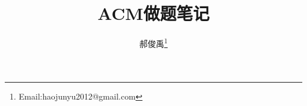 \documentclass[10pt,a4paper]{article}
\begin{document}
\begin{CJK*}{UTF8}{gkai}
\title{ACM做题笔记}							   					%
\author{郝俊禹\thanks{Email:haojunyu2012@gmail.com}}				%
\date{}                                             				%
\maketitle                                          				%
\tableofcontents 												%
\clearpage


%
%
%


\clearpage     
\end{CJK*}
\end{document}
